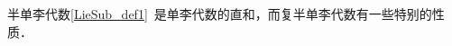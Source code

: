 
\begin{issues}
\issueDraft
\end{issues}


半单李代数\autoref{LieSub_def1}~是单李代数的直和，而复半单李代数有一些特别的性质．

\begin{theorem}{}

\end{theorem}


